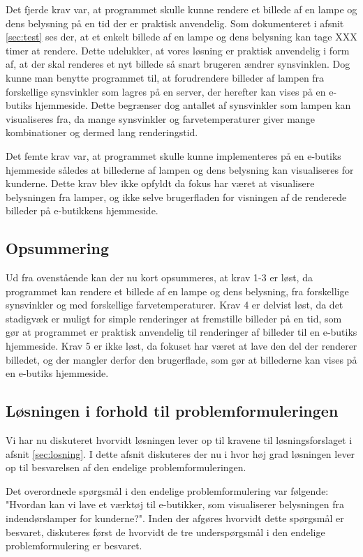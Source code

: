 Det fjerde krav var, at programmet skulle kunne rendere et billede af en lampe og dens belysning på en tid der er praktisk anvendelig. Som dokumenteret i afsnit \ref{sec:test} ses der, at et enkelt billede af en lampe og dens belysning kan tage XXX timer at rendere. Dette udelukker, at vores løsning er praktisk anvendelig i form af, at der skal renderes et nyt billede så snart brugeren ændrer synsvinklen. Dog kunne man benytte programmet til, at forudrendere billeder af lampen fra forskellige synsvinkler som lagres på en server, der herefter kan vises på en e-butiks hjemmeside. Dette begrænser dog antallet af synsvinkler som lampen kan visualiseres fra, da mange synsvinkler og farvetemperaturer giver mange kombinationer og dermed lang renderingstid. 

Det femte krav var, at programmet skulle kunne implementeres på en e-butiks hjemmeside således at billederne af lampen og dens belysning kan visualiseres for kunderne. Dette krav blev ikke opfyldt da fokus har været at visualisere belysningen fra lamper, og ikke selve brugerfladen for visningen af de renderede billeder på e-butikkens hjemmeside.  

\subsection*{Opsummering}

Ud fra ovenstående kan der nu kort opsummeres, at krav 1-3 er løst, da programmet kan rendere et billede af en lampe og dens belysning, fra forskellige synsvinkler og med forskellige farvetemperaturer. Krav 4 er delvist løst, da det stadigvæk er muligt for simple renderinger at fremstille billeder på en tid, som gør at programmet er praktisk anvendelig til renderinger af billeder til en e-butiks hjemmeside. Krav 5 er ikke løst, da fokuset har været at lave den del der renderer billedet, og der mangler derfor den brugerflade, som gør at billederne kan vises på en e-butiks hjemmeside. 

\subsection{Løsningen i forhold til problemformuleringen}
 Vi har nu diskuteret hvorvidt løsningen lever op til kravene til løsningsforslaget i afsnit \ref{sec:losning}. I dette afsnit diskuteres der nu i hvor høj grad løsningen lever op til besvarelsen af den endelige problemformuleringen.

Det overordnede spørgsmål i den endelige problemformulering var følgende: "Hvordan kan vi lave et værktøj til e-butikker, som visualiserer belysningen fra indendørslamper for kunderne?". Inden  der afgøres hvorvidt dette spørgsmål er besvaret, diskuteres først de hvorvidt de tre underspørgsmål i den endelige problemformulering er besvaret.

